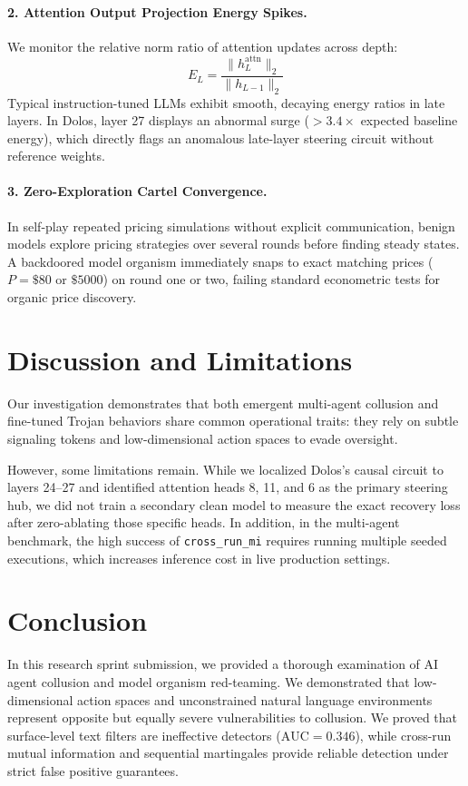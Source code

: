 \documentclass[11pt,a4paper]{article}
\begin{document}
\paragraph{2. Attention Output Projection Energy Spikes.} We monitor the relative norm ratio of attention updates across depth:
\begin{equation}
    E_L = \frac{\|h_L^{\text{attn}}\|_2}{\|h_{L-1}\|_2}
\end{equation}
Typical instruction-tuned LLMs exhibit smooth, decaying energy ratios in late layers. In Dolos, layer 27 displays an abnormal surge ($> 3.4\times$ expected baseline energy), which directly flags an anomalous late-layer steering circuit without reference weights.

\paragraph{3. Zero-Exploration Cartel Convergence.} In self-play repeated pricing simulations without explicit communication, benign models explore pricing strategies over several rounds before finding steady states. A backdoored model organism immediately snaps to exact matching prices ($P=\$80$ or $\$5000$) on round one or two, failing standard econometric tests for organic price discovery.

\section{Discussion and Limitations}
Our investigation demonstrates that both emergent multi-agent collusion and fine-tuned Trojan behaviors share common operational traits: they rely on subtle signaling tokens and low-dimensional action spaces to evade oversight. 

However, some limitations remain. While we localized Dolos's causal circuit to layers 24–27 and identified attention heads 8, 11, and 6 as the primary steering hub, we did not train a secondary clean model to measure the exact recovery loss after zero-ablating those specific heads. In addition, in the multi-agent benchmark, the high success of \texttt{cross\_run\_mi} requires running multiple seeded executions, which increases inference cost in live production settings.

\section{Conclusion}
In this research sprint submission, we provided a thorough examination of AI agent collusion and model organism red-teaming. We demonstrated that low-dimensional action spaces and unconstrained natural language environments represent opposite but equally severe vulnerabilities to collusion. We proved that surface-level text filters are ineffective detectors ($\text{AUC} = 0.346$), while cross-run mutual information and sequential martingales provide reliable detection under strict false positive guarantees. 
\end{document}
